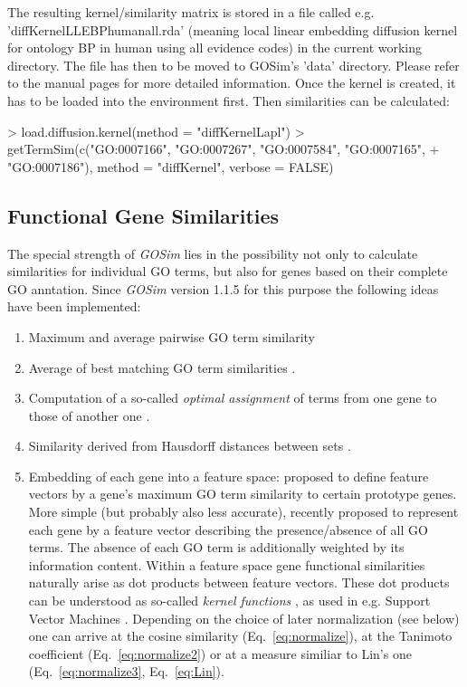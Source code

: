 \documentclass[12pt,a4paper]{article}
\begin{document}
The resulting kernel/similarity matrix is stored in a file called e.g. 'diffKernelLLEBPhumanall.rda' (meaning local linear embedding diffusion kernel for ontology BP in human using all evidence codes) in the current working directory. The file has then to be moved to GOSim's 'data' directory. Please refer to the manual pages for more detailed information. Once the kernel is created, it has to be loaded into the environment first. Then similarities can be calculated:
\begin{Schunk}
\begin{Sinput}
> load.diffusion.kernel(method = "diffKernelLapl")
> getTermSim(c("GO:0007166", "GO:0007267", "GO:0007584", "GO:0007165", 
+     "GO:0007186"), method = "diffKernel", verbose = FALSE)
\end{Sinput}
\end{Schunk}

\subsection{Functional Gene Similarities}

The special strength of \emph{GOSim} lies in the possibility not only to calculate similarities for individual GO terms, but also for genes based on their complete GO anntation. Since \emph{GOSim} version 1.1.5 for this purpose the following ideas have been implemented: 
\begin{enumerate}
\item Maximum and average pairwise GO term similarity
\item Average of best matching GO term similarities \cite{Schlicker2006GOFuncSim}.
\item Computation of a so-called \emph{optimal assignment} of terms from one gene to those of another one \cite{FroeSpeerGOKer06}.
\item Similarity derived from Hausdorff distances between sets \cite{Pozo2008GOFuncSim}.
\item Embedding of each gene into a feature space: \cite{FroeGO05,FroeSpeerGOKer06} proposed to define feature vectors by a gene's maximum GO term similarity to certain prototype genes. More simple (but probably also less accurate), \cite{Mistry2008GOFuncSim} recently proposed to represent each gene by a feature vector describing the presence/absence of all GO terms. The absence of each GO term is additionally weighted by its information content. Within a feature space gene functional similarities naturally arise as dot products between feature vectors. These dot products can be understood as so-called \emph{kernel functions} \cite{SchSmo02}, as used in e.g. Support Vector Machines \cite{CorVap95}. Depending on the choice of later normalization (see below) one can arrive at the cosine similarity (Eq.~\ref{eq:normalize}), at the Tanimoto coefficient (Eq.~\ref{eq:normalize2}) or at a measure similiar to Lin's one (Eq.~\ref{eq:normalize3}, Eq.~\ref{eq:Lin}).
\end{enumerate}
\end{document}
